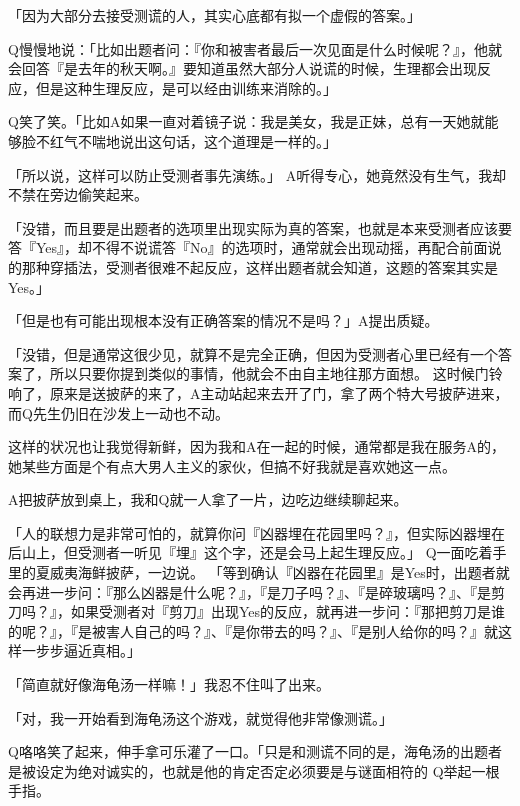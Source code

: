 \documentclass{article}
\begin{document}
「因为大部分去接受测谎的人，其实心底都有拟一个虚假的答案。」 

Q慢慢地说：「比如出题者问：『你和被害者最后一次见面是什么时候呢？』，他就会回答『是去年的秋天啊。』要知道虽然大部分人说谎的时候，生理都会出现反应，但是这种生理反应，是可以经由训练来消除的。」 

Q笑了笑。「比如A如果一直对着镜子说：我是美女，我是正妹，总有一天她就能够脸不红气不喘地说出这句话，这个道理是一样的。」 

\newpage

「所以说，这样可以防止受测者事先演练。」
A听得专心，她竟然没有生气，我却不禁在旁边偷笑起来。 

「没错，而且要是出题者的选项里出现实际为真的答案，也就是本来受测者应该要答『Yes』，却不得不说谎答『No』的选项时，通常就会出现动摇，再配合前面说的那种穿插法，受测者很难不起反应，这样出题者就会知道，这题的答案其实是Yes。」 

「但是也有可能出现根本没有正确答案的情况不是吗？」A提出质疑。 

「没错，但是通常这很少见，就算不是完全正确，但因为受测者心里已经有一个答案了，所以只要你提到类似的事情，他就会不由自主地往那方面想。
这时候门铃响了，原来是送披萨的来了，A主动站起来去开了门，拿了两个特大号披萨进来，而Q先生仍旧在沙发上一动也不动。 

这样的状况也让我觉得新鲜，因为我和A在一起的时候，通常都是我在服务A的，她某些方面是个有点大男人主义的家伙，但搞不好我就是喜欢她这一点。 

\newpage

A把披萨放到桌上，我和Q就一人拿了一片，边吃边继续聊起来。 

「人的联想力是非常可怕的，就算你问『凶器埋在花园里吗？』，但实际凶器埋在后山上，但受测者一听见『埋』这个字，还是会马上起生理反应。」
Q一面吃着手里的夏威夷海鲜披萨，一边说。
「等到确认『凶器在花园里』是Yes时，出题者就会再进一步问：『那么凶器是什么呢？』，『是刀子吗？』、『是碎玻璃吗？』、『是剪刀吗？』，如果受测者对『剪刀』出现Yes的反应，就再进一步问：『那把剪刀是谁的呢？』，『是被害人自己的吗？』、『是你带去的吗？』、『是别人给你的吗？』就这样一步步逼近真相。」 

「简直就好像海龟汤一样嘛！」我忍不住叫了出来。 

「对，我一开始看到海龟汤这个游戏，就觉得他非常像测谎。」 

Q咯咯笑了起来，伸手拿可乐灌了一口。「只是和测谎不同的是，海龟汤的出题者是被设定为绝对诚实的，也就是他的肯定否定必须要是与谜面相符的
Q举起一根手指。 

\newpage
\end{document}
